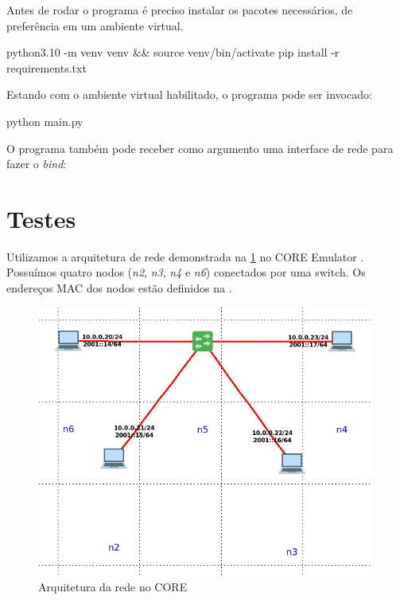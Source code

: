 Antes de rodar o programa é preciso instalar os pacotes necessários, de preferência em um ambiente virtual.

\begin{commandshell}
python3.10 -m venv venv && source venv/bin/activate
pip install -r requirements.txt
\end{commandshell}

Estando com o ambiente virtual habilitado, o programa pode ser invocado:

\begin{commandshell}
python main.py
\end{commandshell}

O programa também pode receber como argumento uma interface de rede para fazer o \textit{bind}:


\section{Testes}

Utilizamos a arquitetura de rede demonstrada na \figurename{ \ref{fig:core_emu}} no CORE Emulator \cite{core_emu}.
Possuímos quatro nodos (\textit{n2}, \textit{n3}, \textit{n4} e \textit{n6}) conectados por uma switch.
Os endereços MAC dos nodos estão definidos na \tableautorefname{ \ref{tab:mac_addrs}}.

\begin{figure}[H]
    \centering
    \includegraphics[width=30em]{CORE_EMU.png}
    \caption{Arquitetura da rede no CORE}
    \label{fig:core_emu}
\end{figure}

